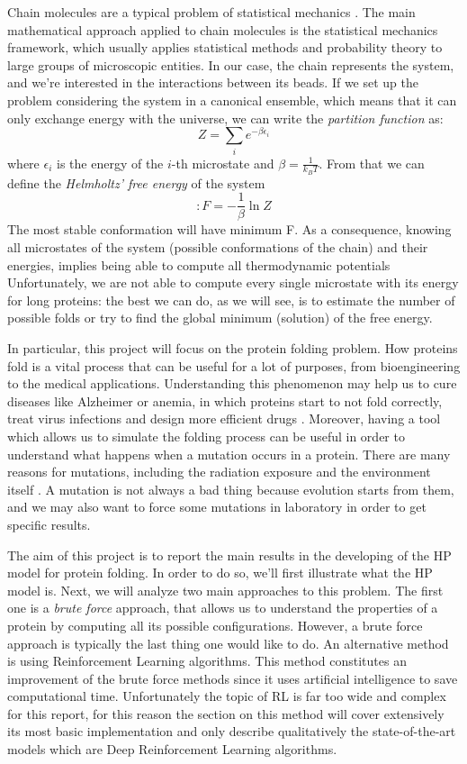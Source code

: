 Chain molecules are a typical problem of statistical mechanics \cite{statisticalmechanics}.
The main mathematical approach applied to chain molecules is the statistical mechanics framework, which usually applies statistical methods and probability theory to large groups of microscopic entities.
In our case, the chain represents the system, and we're interested in the interactions between its beads.
If we set up the problem considering the system in a canonical ensemble, which means that it can only exchange energy with the universe, we can write the \emph{partition function} as:
\begin{equation*}
    Z = \sum_i e^{-\beta\epsilon_i}
\end{equation*}
where $\epsilon_i$ is the energy of the $i$-th microstate and $\beta = \frac{1}{k_BT}$.
From that we can define the \emph{Helmholtz' free energy} of the system
\begin{equation*}:
    F = -\frac{1}{\beta} \ln Z
\end{equation*}
The most stable conformation will have minimum F.
As a consequence, knowing all microstates of the system (possible conformations of the chain) and their energies, implies being able to compute all thermodynamic potentials
Unfortunately, we are not able to compute every single microstate with its energy for long proteins: the best we can do, as we will see, is to estimate the number of possible folds or try to find the global minimum (solution) of the free energy.

In particular, this project will focus on the protein folding problem.
How proteins fold is a vital process that can be useful for a lot of purposes, from bioengineering to the medical applications.
Understanding this phenomenon may help us to cure diseases like Alzheimer or anemia, in which proteins start to not fold correctly, treat virus infections and design more efficient drugs \cite{PERM}. 
Moreover, having a tool which allows us to simulate the folding process can be useful in order to understand what happens when a mutation occurs in a protein.
There are many reasons for mutations, including the radiation exposure and the environment itself \cite{zanichelli}.
A mutation is not always a bad thing because evolution starts from them, and we may also want to force some mutations in laboratory in order to get specific results.

The aim of this project is to report the main results in the developing of the HP model for protein folding.
In order to do so, we'll first illustrate what the HP model is.
Next, we will analyze two main approaches to this problem.
The first one is a \emph{brute force} approach, that allows us to understand the properties of a protein by computing all its possible configurations.
However, a brute force approach is typically the last thing one would like to do.
An alternative method is using Reinforcement Learning algorithms.
This method constitutes an improvement of the brute force methods since it uses artificial intelligence to save computational time. 
Unfortunately the topic of RL is far too wide and complex for this report, for this reason the section on this method will cover extensively its most basic implementation and only describe qualitatively the state-of-the-art models which are Deep Reinforcement Learning algorithms.
